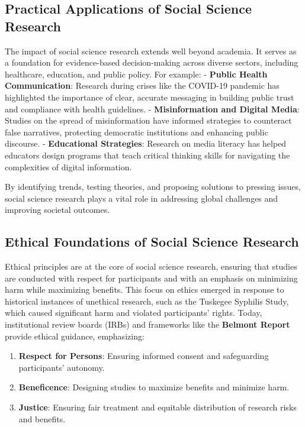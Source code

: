 \documentclass[
]{book}
\providecommand{\tightlist}{%
  \setlength{\itemsep}{0pt}\setlength{\parskip}{0pt}}
\begin{document}
\subsection*{Practical Applications of Social Science Research}\label{practical-applications-of-social-science-research}

The impact of social science research extends well beyond academia. It serves as a foundation for evidence-based decision-making across diverse sectors, including healthcare, education, and public policy. For example: - \textbf{Public Health Communication}: Research during crises like the COVID-19 pandemic has highlighted the importance of clear, accurate messaging in building public trust and compliance with health guidelines. - \textbf{Misinformation and Digital Media}: Studies on the spread of misinformation have informed strategies to counteract false narratives, protecting democratic institutions and enhancing public discourse. - \textbf{Educational Strategies}: Research on media literacy has helped educators design programs that teach critical thinking skills for navigating the complexities of digital information.

By identifying trends, testing theories, and proposing solutions to pressing issues, social science research plays a vital role in addressing global challenges and improving societal outcomes.

\subsection*{Ethical Foundations of Social Science Research}\label{ethical-foundations-of-social-science-research}

Ethical principles are at the core of social science research, ensuring that studies are conducted with respect for participants and with an emphasis on minimizing harm while maximizing benefits. This focus on ethics emerged in response to historical instances of unethical research, such as the Tuskegee Syphilis Study, which caused significant harm and violated participants' rights. Today, institutional review boards (IRBs) and frameworks like the \textbf{Belmont Report} provide ethical guidance, emphasizing:

\begin{enumerate}
\def\labelenumi{\arabic{enumi}.}
\tightlist
\item
  \textbf{Respect for Persons}: Ensuring informed consent and safeguarding participants' autonomy.
\item
  \textbf{Beneficence}: Designing studies to maximize benefits and minimize harm.
\item
  \textbf{Justice}: Ensuring fair treatment and equitable distribution of research risks and benefits.
\end{enumerate}
\end{document}
